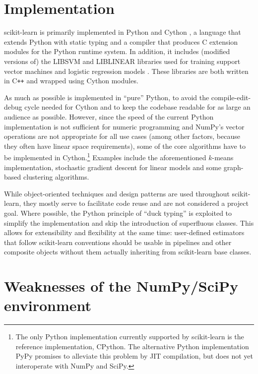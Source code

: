 \documentclass[a4paper]{article}
\begin{document}
\section{Implementation}

scikit-learn is primarily implemented in Python and Cython
\citep{behnel2011cython},
a language that extends Python with static typing
and a compiler that produces C extension modules
for the Python runtime system.
In addition, it includes (modified versions of)
the \textsf{LIBSVM} and \textsf{LIBLINEAR} libraries
used for training support vector machines
and logistic regression models \citep{chang2011libsvm, fan2008}.
These libraries are both written in C{}\verb!++!
and wrapped using Cython modules.

As much as possible is implemented in ``pure'' Python,
to avoid the compile-edit-debug cycle needed for Cython
and to keep the codebase readable for as large an audience as possible.
However, since the speed of the current Python implementation
is not sufficient for numeric programming
and NumPy's vector operations are not appropriate for all use cases
(among other factors, because they often have linear space requirements),
some of the core algorithms have to be implemented in Cython.\footnote{
  The only Python implementation currently supported by scikit-learn
  is the reference implementation, CPython.
  The alternative Python implementation PyPy \citep{bolz2009tracing}
  promises to alleviate this problem by JIT compilation,
  but does not yet interoperate with NumPy and SciPy.
}
Examples include the aforementioned $k$-means implementation,
stochastic gradient descent for linear models
and some graph-based clustering algorithms.

While object-oriented techniques and design patterns
are used throughout scikit-learn,
they mostly serve to facilitate code reuse and are not considered a project goal.
Where possible, the Python principle of ``duck typing'' is exploited
to simplify the implementation and skip the introduction of superfluous classes.
This allows for extensibility and flexibility at the same time:
user-defined estimators that follow scikit-learn conventions
should be usable in pipelines and other composite objects
without them actually inheriting from scikit-learn base classes.

\section{Weaknesses of the NumPy/SciPy environment}
\end{document}
